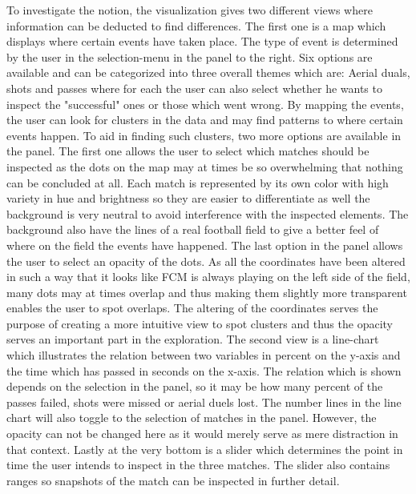 \documentclass[Report.tex]{subfiles}
\begin{document}
To investigate the notion, the visualization gives two different views where information can be deducted to find differences. The first one is a map which displays where certain events have taken place. The type of event is determined by the user in the selection-menu in the panel to the right. Six options are available and can be categorized into three overall themes which are: Aerial duals, shots and passes where for each the user can also select whether he wants to inspect the "successful" ones or those which went wrong. By mapping the events, the user can look for clusters in the data and may find patterns to where certain events happen. To aid in finding such clusters, two more options are available in the panel. The first one allows the user to select which matches should be inspected as the dots on the map may at times be so overwhelming that nothing can be concluded at all. Each match is represented by its own color with high variety in hue and brightness so they are easier to differentiate as well the background is very neutral to avoid interference with the inspected elements. The background also have the lines of a real football field to give a better feel of where on the field the events have happened. The last option in the panel allows the user to select an opacity of the dots. As all the coordinates have been altered in such a way that it looks like FCM is always playing on the left side of the field, many dots may at times overlap and thus making them slightly more transparent enables the user to spot overlaps. The altering of the coordinates serves the purpose of creating a more intuitive view to spot clusters and thus the opacity serves an important part in the exploration. The second view is a line-chart which illustrates the relation between two variables in percent on the y-axis and the time which has passed in seconds on the x-axis. The relation which is shown depends on the selection in the panel, so it may be how many percent of the passes failed, shots were missed or aerial duels lost. The number lines in the line chart will also toggle to the selection of matches in the panel. However, the opacity can not be changed here as it would merely serve as mere distraction in that context. Lastly at the very bottom is a slider which determines the point in time the user intends to inspect in the three matches. The slider also contains ranges so snapshots of the match can be inspected in further detail.\\
\end{document}
